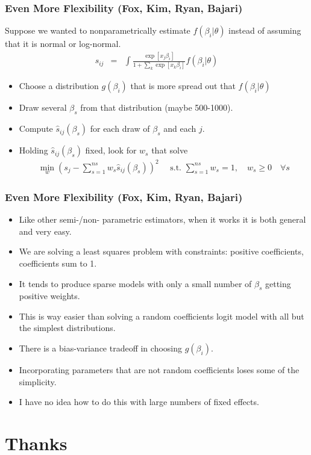 \begin{frame}
\frametitle{Even More Flexibility (Fox, Kim, Ryan, Bajari)}
Suppose we wanted to nonparametrically estimate $f(\beta_i | \theta)$ instead of assuming that it is normal or log-normal.
\begin{eqnarray*}
s_{ij} &=& \int \frac{\exp[x_{j} \beta_i  ]}{1+\sum_k \exp[x_{k} \beta_i  ]} f(\beta_i | \theta)
\end{eqnarray*}
\begin{itemize}
\item Choose a distribution $g(\beta_i)$ that is more spread out that $f(\beta_i | \theta)$
\item Draw several $\beta_{s}$ from that distribution (maybe 500-1000).
\item Compute $\hat{s}_{ij}(\beta_s)$ for each draw of $\beta_s$ and each $j$.
\item Holding $\hat{s}_{ij}(\beta_s)$ fixed, look for $w_s$ that solve
\begin{eqnarray*}
\min_w \left(s_j -  \sum_{s=1}^{ns} w_s \hat{s}_{ij}(\beta_s) \right)^2 \quad \mbox{ s.t. } \sum_{s=1}^{ns} w_s = 1, \quad w_s \geq 0 \quad \forall s
\end{eqnarray*}
\end{itemize}
\end{frame}

\begin{frame}
\frametitle{Even More Flexibility (Fox, Kim, Ryan, Bajari)}
\begin{itemize}
\item Like other semi-/non- parametric estimators, when it works it is both general and very easy.
\item We are solving a least squares problem with constraints: positive coefficients, coefficients sum to 1.
\item It tends to produce \alert{sparse models} with only a small number of $\beta_s$ getting positive weights.
\item This is way easier than solving a random coefficients logit model with all but the simplest distributions.
\item There is a bias-variance tradeoff in choosing $g(\beta_i)$.
\item Incorporating parameters that are not random coefficients loses some of the simplicity.
\item I have no idea how to do this with large numbers of fixed effects.
\end{itemize}
\end{frame}




\section*{Thanks}


